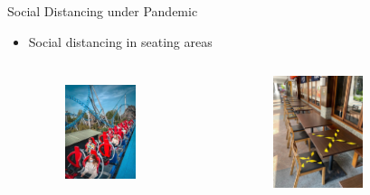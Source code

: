   \begin{frame}{Social Distancing under Pandemic}
    \begin{itemize}
      \item Social distancing in seating areas
      \begin{columns}[c]  %
        \column{5cm}  %
        \begin{figure}[ht]
          \centering
          \includegraphics[width = 0.8\textwidth, height=0.6\textwidth]{./images/park_social_distancing.jpg}

        \end{figure}
        \column{5cm}
        \scriptsize
        \begin{figure}[ht]
          \centering
          \includegraphics[width=0.8\textwidth,height=0.6\textwidth]{./images/tape_measures.jpg}
        \end{figure}

        \end{columns} 
        

\end{itemize}
\end{frame}
